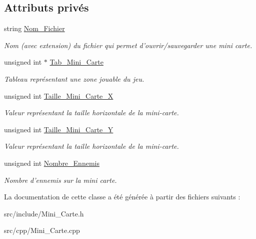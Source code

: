 \subsection*{Attributs privés}
\begin{DoxyCompactItemize}
\item 
\hypertarget{classMini__Carte_ad428c788dfb171b10f7a7f8153498475}{string \hyperlink{classMini__Carte_ad428c788dfb171b10f7a7f8153498475}{Nom\+\_\+\+Fichier}}\label{classMini__Carte_ad428c788dfb171b10f7a7f8153498475}

\begin{DoxyCompactList}\small\item\em Nom (avec extension) du fichier qui permet d'ouvrir/sauvegarder une mini carte. \end{DoxyCompactList}\item 
\hypertarget{classMini__Carte_a59fed7ef487bae072e47c6898ee1f807}{unsigned int $\ast$ \hyperlink{classMini__Carte_a59fed7ef487bae072e47c6898ee1f807}{Tab\+\_\+\+Mini\+\_\+\+Carte}}\label{classMini__Carte_a59fed7ef487bae072e47c6898ee1f807}

\begin{DoxyCompactList}\small\item\em Tableau représentant une zone jouable du jeu. \end{DoxyCompactList}\item 
\hypertarget{classMini__Carte_a42d3fb10ef213e81417be02af11db56b}{unsigned int \hyperlink{classMini__Carte_a42d3fb10ef213e81417be02af11db56b}{Taille\+\_\+\+Mini\+\_\+\+Carte\+\_\+\+X}}\label{classMini__Carte_a42d3fb10ef213e81417be02af11db56b}

\begin{DoxyCompactList}\small\item\em Valeur représentant la taille horizontale de la mini-\/carte. \end{DoxyCompactList}\item 
\hypertarget{classMini__Carte_a4c62f6e1912da87652645dd70d0fde8f}{unsigned int \hyperlink{classMini__Carte_a4c62f6e1912da87652645dd70d0fde8f}{Taille\+\_\+\+Mini\+\_\+\+Carte\+\_\+\+Y}}\label{classMini__Carte_a4c62f6e1912da87652645dd70d0fde8f}

\begin{DoxyCompactList}\small\item\em Valeur représentant la taille horizontale de la mini-\/carte. \end{DoxyCompactList}\item 
\hypertarget{classMini__Carte_a348d0f6a599e8dc5bacda2150b8dd5d0}{unsigned int \hyperlink{classMini__Carte_a348d0f6a599e8dc5bacda2150b8dd5d0}{Nombre\+\_\+\+Ennemis}}\label{classMini__Carte_a348d0f6a599e8dc5bacda2150b8dd5d0}

\begin{DoxyCompactList}\small\item\em Nombre d'ennemis sur la mini carte. \end{DoxyCompactList}\end{DoxyCompactItemize}


La documentation de cette classe a été générée à partir des fichiers suivants \+:\begin{DoxyCompactItemize}
\item 
src/include/Mini\+\_\+\+Carte.\+h\item 
src/cpp/Mini\+\_\+\+Carte.\+cpp\end{DoxyCompactItemize}

